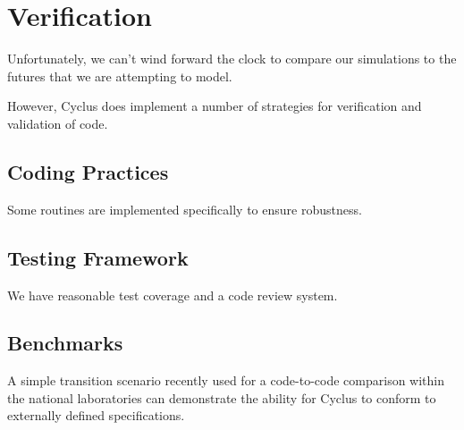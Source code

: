 \section{Verification}
%

%


Unfortunately, we can't wind forward the clock to compare our simulations to 
the futures that we are attempting to model.

However, Cyclus does implement a number of strategies for verification and 
validation of code.

\subsection{Coding Practices}

Some routines are implemented specifically to ensure robustness.

\subsection{Testing Framework}

We have reasonable test coverage and a code review system. 

\subsection{Benchmarks}

A simple transition scenario recently used for a code-to-code comparison within 
the national laboratories can demonstrate the ability for Cyclus to conform to 
externally defined specifications.
